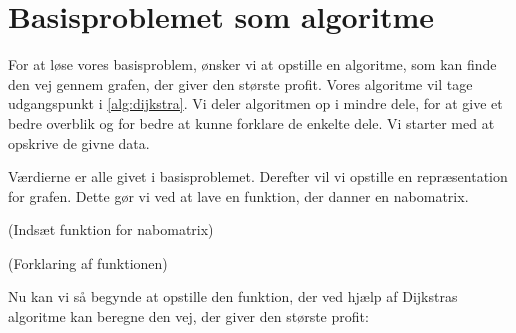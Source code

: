 \section{Basisproblemet som algoritme}
For at løse vores basisproblem, ønsker vi at opstille en algoritme, som kan finde den vej gennem grafen, der giver den største profit. Vores algoritme vil tage udgangspunkt i \autoref{alg:dijkstra}. Vi deler algoritmen op i mindre dele, for at give et bedre overblik og for bedre at kunne forklare de enkelte dele. Vi starter med at opskrive de givne data. 



Værdierne er alle givet i basisproblemet. Derefter vil vi opstille en repræsentation for grafen. Dette gør vi ved at lave en funktion, der danner en nabomatrix.

(Indsæt funktion for nabomatrix)

(Forklaring af funktionen)

Nu kan vi så begynde at opstille den funktion, der ved hjælp af Dijkstras algoritme kan beregne den vej, der giver den største profit:



